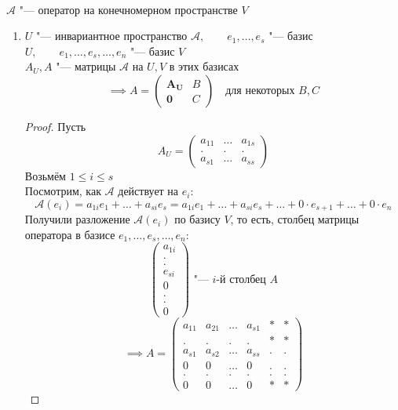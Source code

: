 \begin{theorem}
    \hfill \\
	$ \mathcal{A} $ "--- оператор на конечномерном пространстве $ V $
	\begin{enumerate}
		\item $ U $ "--- инвариантное пространство $ \mathcal{A}, \qquad e_1, \dots, e_s $ "--- базис $ U, \qquad e_1, \dots, e_s, \dots, e_n $ "--- базис $ V $ \\
		$ A_U, A $ "--- матрицы $ \mathcal{A} $ на $ U, V $ в этих базисах
		$$ \implies A =
		\begin{pmatrix}
			\bm{A_U} & B \\
			\bm0 & C
		\end{pmatrix} \quad \text{для некоторых } B, C $$
		\begin{proof}
			Пусть
			$$ A_U =
			\begin{pmatrix}
				a_{11} & \dots & a_{1s} \\
				. & . & . \\
				a_{s1} & \dots & a_{ss}
			\end{pmatrix} $$
			Возьмём $ 1 \le i \le s $ \\
			Посмотрим, как $ \mathcal{A} $ действует на $ e_i $:
			$$ \mathcal{A}(e_i) = a_{1i}e_1 + \dots + a_{si}e_s = a_{1i}e_1 + \dots + a_{si}e_s + \dots + 0 \cdot e_{s + 1} + \dots + 0 \cdot e_n $$
			Получили разложение $ \mathcal{A}(e_i) $ по базису $ V $, то есть, столбец матрицы оператора в базисе $ e_1, \dots, e_s, \dots, e_n $:
			$$
			\begin{pmatrix}
				a_{1i} \\
				. \\
				. \\
				e_{si} \\
				0 \\
				. \\
				. \\
				0
			\end{pmatrix} \text{ "--- } i \text{-й столбец } A $$
			$$ \implies A =
			\begin{pmatrix}
				a_{11} & a_{21} & \dots & a_{s1} & * & * \\
				. & . & . & . & * & * \\
				a_{s1} & a_{s2} & \dots & a_{ss} & . & . \\
				0 & 0 & \dots & 0 & . & . \\
				. & . & . & . & . & . \\
				0 & 0 & \dots & 0 & * & *

\end{pmatrix}$$
\end{proof}
\end{enumerate}
\end{theorem}
